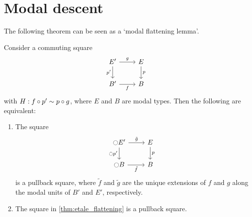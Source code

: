 \documentclass[9pt,twosided]{amsart}
\begin{document}
\section{Modal descent}

The following theorem can be seen as a `modal flattening lemma'.

\begin{thm}\label{thm:etale_flattening}
Consider a commuting square
\begin{equation*}
\begin{tikzcd}
E' \arrow[d,swap,"{p'}"] \arrow[r,"g"] & E \arrow[d,"p"] \\
B' \arrow[r,swap,"f"] & B
\end{tikzcd}
\end{equation*}
with $H:f\circ p'\sim p\circ g$, where $E$ and $B$ are modal types. Then the following are equivalent:
\begin{enumerate}
\item The square
  \begin{equation*}
    \begin{tikzcd}
      \modal E' \arrow[r,"\tilde{g}"] \arrow[d,swap,"{\modal p'}"] & E \arrow[d,"p"] \\
      \modal B \arrow[r,swap,"\tilde{f}"] & B
    \end{tikzcd}
  \end{equation*}
  is a pullback square, where $\tilde{f}$ and $\tilde{g}$ are the unique extensions of $f$ and $g$ along the modal units of $B'$ and $E'$, respectively.
\item The square in \cref{thm:etale_flattening} is a pullback square.
\end{enumerate}
\end{thm}
\end{document}
